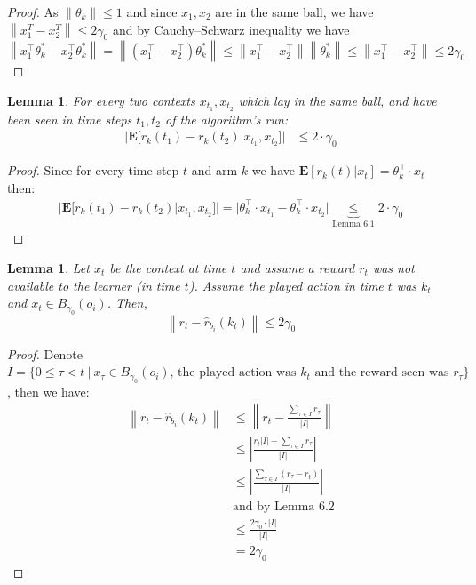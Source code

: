 \documentclass{article}
\newcommand{\norm}[1]{\left\lVert#1\right\rVert}
\newtheorem{lemma}[theorem]{Lemma}
\begin{document}
\begin{proof}
    As $\norm{\theta_k} \leq 1$ and since $x_1,x_2$ are in the same ball, we have $\norm{x_1^T - x_2^T} \leq 2\gamma_0$ and by Cauchy–Schwarz inequality we have
    \begin{equation}
      \norm{x_1^\top \theta^*_k - x_2^\top \theta^*_k} =  \norm{(x_1^\top- x_2^\top)\theta^*_k} \leq \norm{x_1^\top- x_2^\top}\norm{\theta^*_k} \leq \norm{x_1^\top- x_2^\top} \leq 2\gamma_0  
    \end{equation}
\end{proof}

\begin{lemma}
For every two contexts $x_{t_1}, x_{t_2}$ which lay in the same ball, and have been seen in time steps $t_1, t_2$ of the algorithm's run:
\begin{equation}
    \begin{split}
        |\mathbf{E}[r_k(t_1) - r_k(t_2)|x_{t_1},x_{t_2}]| 
        &\leq 2 \cdot \gamma_0
    \end{split}
\end{equation}
\end{lemma}

\begin{proof}
Since for every time step $t$ and arm $k$ we have $\mathbf{E}[r_k(t)|x_t] = \theta_k^{\top} \cdot x_t$ then:
 \begin{equation}
    \begin{split}
        |\mathbf{E}[r_k(t_1) - r_k(t_2)|x_{t_1},x_{t_2}]| = |\theta^\top_k \cdot x_{t_1} - \theta^\top_k \cdot x_{t_2}| \underbrace{\leq}_{\text{Lemma  6.1}} 2 \cdot \gamma_0
    \end{split}
\end{equation}
\end{proof}

\begin{lemma}

Let $x_t$ be the context at time $t$ and assume a reward $r_t$ was not available to the learner (in time $t$). Assume the played action in time $t$ was $k_t$ and $x_t \in B_{\gamma_0}(o_i)$. Then,
$$ \norm{r_t - \hat{r}_{b_i}(k_t)} \leq 2 \gamma_0 $$
\end{lemma}

\begin{proof}
Denote $I = \{0 \leq \tau < t \ | \ x_{\tau}\in B_{\gamma_0}(o_i) \text{, the played action was $k_t$ and the reward seen was } r_{\tau} \}$, then we have:
\begin{equation}
    \begin{split}
        \norm{r_t - \hat{r}_{b_i}(k_t)} &\leq \norm{r_t - \frac{\sum_{\tau \in I} r_{\tau}}{|I|}}\\
        &\leq |\frac{r_t|I| - \sum_{\tau \in I} r_{\tau}}{|I|}|\\
        &\leq |\frac{\sum_{\tau \in I} (r_{\tau}-r_t)}{|I|}|\\
        &\text{and by Lemma 6.2} \\
        &\leq \frac{2\gamma_0 \cdot |I|}{|I|}\\
        &= 2 \gamma_0
    \end{split}
\end{equation}
\end{proof}
\end{document}
